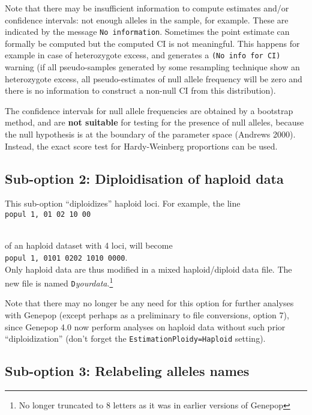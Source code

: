 \documentclass[
  12pt,
]{book}
\begin{document}
Note that there may be insufficient information to compute estimates and/or confidence intervals: not enough alleles in the sample, for example. These are indicated by the message \texttt{No\ information}. Sometimes the point estimate can formally be computed but the computed CI is not meaningful. This happens for example in case of heterozygote excess, and generates a \texttt{(No\ info\ for\ CI)} warning (if all pseudo-samples generated by some resampling technique show an heterozygote excess, all pseudo-estimates of null allele frequency will be zero and there is no information to construct a non-null CI from this distribution).

The confidence intervals for null allele frequencies are obtained by a bootstrap method, and are \textbf{not suitable} for testing for the presence of null alleles, because the null hypothesis is at the boundary of the parameter space (Andrews 2000). Instead, the exact score test for Hardy-Weinberg proportions can be used.

\hypertarget{sub-option-2-diploidisation-of-haploid-data}{%
\subsection{Sub-option 2: Diploidisation of haploid data}\label{sub-option-2-diploidisation-of-haploid-data}}

This sub-option ``diploidizes'' haploid loci. For example, the line\\
\texttt{popul\ 1,\ 01\ 02\ 10\ 00}\strut \\
of an haploid dataset with 4 loci, will become\\
\texttt{popul\ 1,\ 0101\ 0202\ 1010\ 0000}.\\
Only haploid data are thus modified in a mixed haploid/diploid data file. The new file is named \texttt{D}\emph{yourdata}.\footnote{No longer truncated to 8 letters as it was in earlier versions of Genepop}

Note that there may no longer be any need for this option for further analyses with Genepop (except perhaps as a preliminary to file conversions, option 7), since Genepop 4.0 now perform analyses on haploid data without such prior ``diploidization'' (don't forget the \texttt{EstimationPloidy=Haploid} setting).

\hypertarget{sub-option-3-relabeling-alleles-names}{%
\subsection{Sub-option 3: Relabeling alleles names}\label{sub-option-3-relabeling-alleles-names}}
\end{document}
